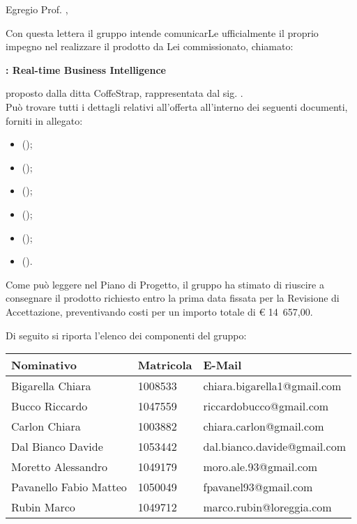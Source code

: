 \documentclass{letter}
\begin{document}
\begin{letter}{}

	\vspace{4cm}
	
	\opening{Egregio Prof. \committente{},}
	
	Con questa lettera il gruppo \groupname{} intende comunicarLe ufficialmente il proprio impegno nel realizzare il prodotto da Lei commissionato, chiamato:
	\begin{center}
		\textbf{\projectname{}: Real-time Business Intelligence}
	\end{center}
	proposto dalla ditta CoffeStrap, rappresentata dal sig. \proponente{}.\\
	Può trovare tutti i dettagli relativi all'offerta all'interno dei seguenti documenti, forniti in allegato:

	\begin{itemize}
		\item {} ();
		\item {} ();
		\item {} ();
		\item {} ();
		\item {} ();
		\item {} ().
	\end{itemize}
	Come può leggere nel Piano di Progetto, il gruppo ha stimato di riuscire a consegnare il prodotto richiesto entro la prima data fissata per la Revisione di Accettazione, preventivando costi per un importo totale di \euro{} 14~657,00.

	Di seguito si riporta l'elenco dei componenti del gruppo:
	\begin{center}
		\begin{tabu}{|p{4cm}|p{2.5cm}|p{5cm}|}
		\hline
			\rowfont{\bf}
			\textbf{Nominativo} & \textbf{Matricola} & \textbf{E-Mail} \\ \hline
			Bigarella Chiara & 1008533 & chiara.bigarella1@gmail.com \\ \hline
			Bucco Riccardo & 1047559 & riccardobucco@gmail.com \\ \hline
			Carlon Chiara & 1003882 & chiara.carlon@gmail.com \\ \hline
			Dal Bianco Davide & 1053442 & dal.bianco.davide@gmail.com \\ \hline
			Moretto Alessandro & 1049179 & moro.ale.93@gmail.com \\ \hline
			Pavanello Fabio Matteo & 1050049 & fpavanel93@gmail.com \\ \hline
			Rubin Marco & 1049712 & marco.rubin@loreggia.com \\ \hline
		\end{tabu}
	\end{center}


\end{letter}
\end{document}
